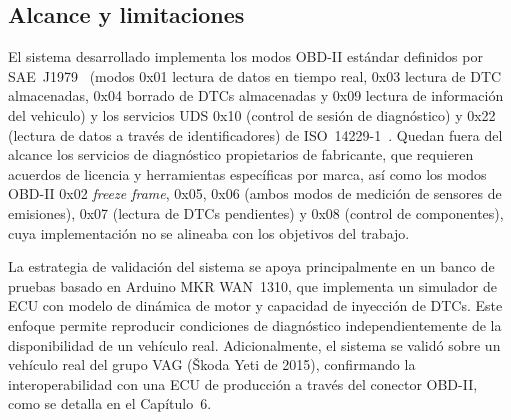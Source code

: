 \subsection{Alcance y limitaciones}
\label{sec:alcance}

El sistema desarrollado implementa los modos OBD-II estándar definidos por SAE~J1979~\cite{SAEJ1979:2014} (modos 0x01 lectura de datos en tiempo real, 0x03 lectura de DTC almacenadas, 0x04 borrado de DTCs almacenadas y 0x09 lectura de información del vehiculo) y los servicios UDS 0x10 (control de sesión de diagnóstico) y 0x22 (lectura de datos a través de identificadores) de ISO~14229-1~\cite{ISO14229-1:2020}. Quedan fuera del alcance los servicios de diagnóstico propietarios de fabricante, que requieren acuerdos de licencia y herramientas específicas por marca, así como los modos OBD-II 0x02 \textit{freeze frame}, 0x05, 0x06 (ambos modos de medición de sensores de emisiones), 0x07 (lectura de DTCs pendientes) y 0x08 (control de componentes), cuya implementación no se alineaba con los objetivos del trabajo.

La estrategia de validación del sistema se apoya principalmente en un banco de pruebas basado en Arduino MKR WAN~1310, que implementa un simulador de ECU con modelo de dinámica de motor y capacidad de inyección de DTCs. Este enfoque permite reproducir condiciones de diagnóstico independientemente de la disponibilidad de un vehículo real. Adicionalmente, el sistema se validó sobre un vehículo real del grupo VAG (Škoda Yeti de 2015), confirmando la interoperabilidad con una ECU de producción a través del conector OBD-II, como se detalla en el Capítulo~6.
